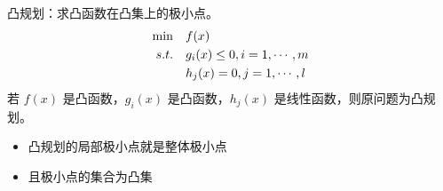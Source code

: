 \begin{definition}
    凸规划：求凸函数在凸集上的极小点。
    \begin{align*}
        \min \quad &f(x)\\ 
        s.t. \quad &g_{i}(x) \le 0, i=1, \cdots, m \\  
        &h_{j}(x)=0, j=1, \cdots, l 
    \end{align*}
    若 $f(x)$ 是凸函数，$g_i(x)$ 是凸函数，$h_j(x)$ 是线性函数，则原问题为凸规划。
    \begin{itemize} 
        \item 凸规划的局部极小点就是整体极小点
        \item 且极小点的集合为凸集
    \end{itemize}
\end{definition}
